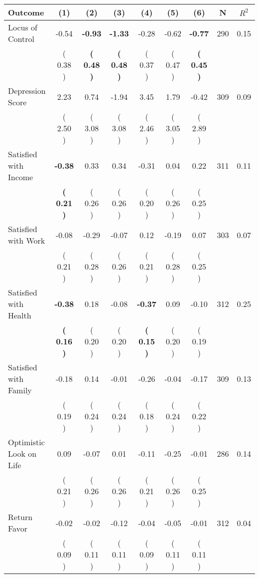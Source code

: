 \begin{tabular}{lcccccccc}
\toprule
 \textbf{Outcome} & \textbf{(1)} & \textbf{(2)} & \textbf{(3)} & \textbf{(4)} & \textbf{(5)} & \textbf{(6)} & \textbf{N} & \textbf{$ R^2$} \\
\midrule
Locus of Control &     -0.54 & \textbf{    -0.93} & \textbf{    -1.33} &     -0.28 &     -0.62 & \textbf{    -0.77} & 290 &       0.15 \\ 
 & (     0.38 ) & \textbf{(     0.48 )} & \textbf{(     0.48 )} & (     0.37 ) & (     0.47 ) & \textbf{(     0.45 )} & \\
Depression Score &      2.23 &      0.74 &     -1.94 &      3.45 &      1.79 &     -0.42 & 309 &       0.09 \\ 
 & (     2.50 ) & (     3.08 ) & (     3.08 ) & (     2.46 ) & (     3.05 ) & (     2.89 ) & \\
Satisfied with Income & \textbf{    -0.38} &      0.33 &      0.34 &     -0.31 &      0.04 &      0.22 & 311 &       0.11 \\ 
 & \textbf{(     0.21 )} & (     0.26 ) & (     0.26 ) & (     0.20 ) & (     0.26 ) & (     0.25 ) & \\
Satisfied with Work &     -0.08 &     -0.29 &     -0.07 &      0.12 &     -0.19 &      0.07 & 303 &       0.07 \\ 
 & (     0.21 ) & (     0.28 ) & (     0.26 ) & (     0.21 ) & (     0.28 ) & (     0.25 ) & \\
Satisfied with Health & \textbf{    -0.38} &      0.18 &     -0.08 & \textbf{    -0.37} &      0.09 &     -0.10 & 312 &       0.25 \\ 
 & \textbf{(     0.16 )} & (     0.20 ) & (     0.20 ) & \textbf{(     0.15 )} & (     0.20 ) & (     0.19 ) & \\
Satisfied with Family &     -0.18 &      0.14 &     -0.01 &     -0.26 &     -0.04 &     -0.17 & 309 &       0.13 \\ 
 & (     0.19 ) & (     0.24 ) & (     0.24 ) & (     0.18 ) & (     0.24 ) & (     0.22 ) & \\
Optimistic Look on Life &      0.09 &     -0.07 &      0.01 &     -0.11 &     -0.25 &     -0.01 & 286 &       0.14 \\ 
 & (     0.21 ) & (     0.26 ) & (     0.26 ) & (     0.21 ) & (     0.26 ) & (     0.25 ) & \\
Return Favor &     -0.02 &     -0.02 &     -0.12 &     -0.04 &     -0.05 &     -0.01 & 312 &       0.04 \\ 
 & (     0.09 ) & (     0.11 ) & (     0.11 ) & (     0.09 ) & (     0.11 ) & (     0.11 ) & \\

\end{tabular}
